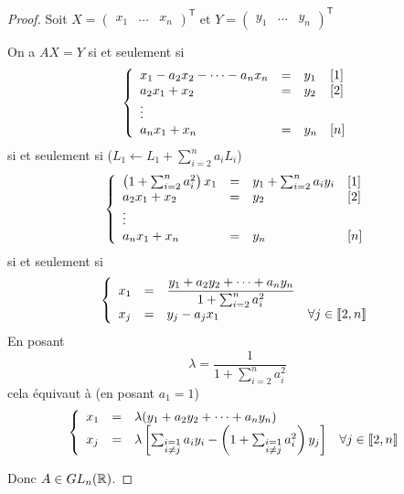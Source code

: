 \begin{proof}
    Soit $X=\begin{pmatrix}
        x_{1} &\dots&x_{n}
    \end{pmatrix}^{\mathsf{T}}$ et $Y=\begin{pmatrix}
        y_{1}&\dots& y_{n}
    \end{pmatrix}^{\mathsf{T}}$

    On a $AX=Y$ si et seulement si 
    \begin{equation}
        \left\lbrace
        \begin{array}[]{lcll}
            x_{1}-a_{2}x_{2}-\dots- a_{n}x_{n} &= &y_{1} &[1]\\
            a_{2}x_{1}+x_{2} &= &y_{2} &[2]\\
            \vdots\\
            a_{n}x_{1}+x_{n}&=&y_{n}&[n]
        \end{array}
        \right.
    \end{equation}
    si et seulement si ($L_{1}\leftarrow L_{1}+\sum_{i=2}^{n}a_{i}L_{i}$)
    \begin{equation}
        \left\lbrace
        \begin{array}[]{lcll}
            \left(1+\sum_{i=2}^{n}a_{i}^{2}\right)x_{1} &= &y_{1}+\sum_{i=2}^{n}a_{i}y_{i} &[1]\\
            a_{2}x_{1}+x_{2} &= &y_{2} &[2]\\
            \vdots\\
            a_{n}x_{1}+x_{n}&=&y_{n}&[n]
        \end{array}
        \right.
    \end{equation}
    si et seulement si 
    \begin{equation}
        \left\lbrace
        \begin{array}[]{lcll}
            x_{1} &= &\dfrac{y_{1}+a_{2}y_{2}+\dots+a_{n}y_{n}}{1+\sum_{i=2}^{n}a_{i}^{2}}\\
            x_{j}&=&y_{j}-a_{j}x_{1} &\forall j\in\llbracket2,n\rrbracket
        \end{array}
        \right.
    \end{equation}
    En posant 
    \begin{equation}
        \lambda=\frac{1}{1+\sum_{i=2}^{n}a_{i}^{2}}
    \end{equation}
    cela équivaut à (en posant $a_{1}=1$)
    \begin{equation}
        \left\lbrace
        \begin{array}[]{lcll}
            x_{1} &= &\lambda(y_{1}+a_{2}y_{2}+\dots+a_{n}y_{n})\\
            x_{j}&=&\lambda\left[\sum_{\substack{i=1\\i\neq j}}a_{i}y_{i}-\left(1+\sum_{\substack{i=1\\i\neq j}}a_{i}^{2}\right)y_{j}\right] &\forall j\in\llbracket2,n\rrbracket
        \end{array}
        \right.
    \end{equation}

    Donc $A\in GL_{n}(\mathbb{R})$.
\end{proof}

